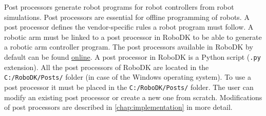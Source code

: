 Post processors generate robot programs for robot controllers from robot simulations. Post processors are essential for offline programming of robots. A post processor defines the vendor-specific rules a robot program must follow. A robotic arm must be linked to a post processor in RoboDK to be able to generate a robotic arm controller program. The post processors available in RoboDK by default can be found \href{https://robodk.com/doc/en/Post-Processors.html#AvailablePosts}{online}.  
A post processor in RoboDK is a Python script (\texttt{.py} extension). All the post processors of RoboDK are located in the
\texttt{C:/RoboDK/Posts/} folder (in case of the Windows operating system).  To use a post processor it must be placed in the \texttt{C:/RoboDK/Posts/} folder. The user can modify an existing post processor or create a new one from scratch. Modifications of post processors are described in \autoref{chap:implementation} in more detail. 
